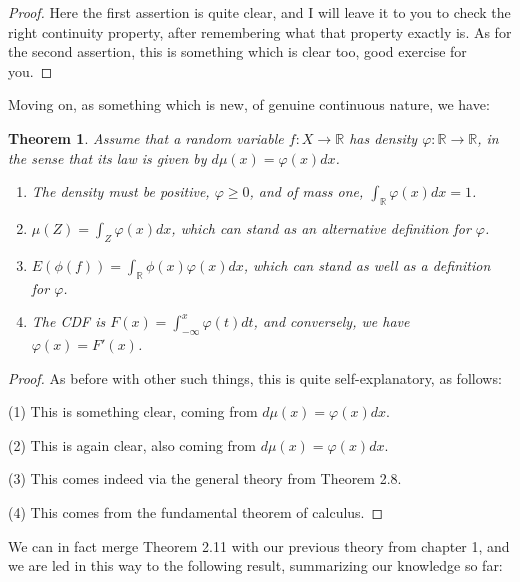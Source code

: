 \documentclass[12pt]{amsbook}
\newtheorem{theorem}{Theorem}[chapter]
\begin{document}
\begin{proof}
Here the first assertion is quite clear, and I will leave it to you to check the right continuity property, after remembering what that property exactly is. As for the second assertion, this is something which is clear too, good exercise for you.
\end{proof}

Moving on, as something which is new, of genuine continuous nature, we have:

\begin{theorem}
Assume that a random variable $f:X\to\mathbb R$ has density $\varphi:\mathbb R\to\mathbb R$, in the sense that its law is given by $d\mu(x)=\varphi(x)dx$.
\begin{enumerate}
\item The density must be positive, $\varphi\geq0$, and of mass one, $\int_\mathbb R\varphi(x)dx=1$.

\item $\mu(Z)=\int_Z\varphi(x)dx$, which can stand as an alternative definition for $\varphi$.

\item $E(\phi(f))=\int_\mathbb R\phi(x)\varphi(x)dx$, which can stand as well as a definition for $\varphi$.

\item The CDF is $F(x)=\int_{-\infty}^x\varphi(t)dt$, and conversely, we have $\varphi(x)=F'(x)$.
\end{enumerate}
\end{theorem}

\begin{proof}
As before with other such things, this is quite self-explanatory, as follows:

\medskip

(1) This is something clear, coming from $d\mu(x)=\varphi(x)dx$.

\medskip

(2) This is again clear, also coming from $d\mu(x)=\varphi(x)dx$.

\medskip

(3) This comes indeed via the general theory from Theorem 2.8.

\medskip

(4) This comes from the fundamental theorem of calculus.
\end{proof}

We can in fact merge Theorem 2.11 with our previous theory from chapter 1, and we are led in this way to the following result, summarizing our knowledge so far:
\end{document}

